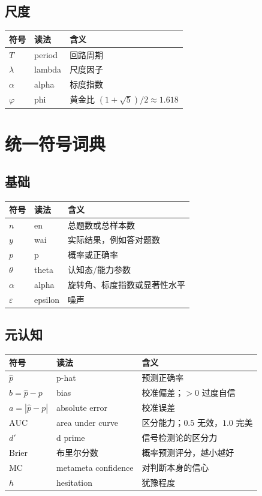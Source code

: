 \documentclass[UTF8,a4paper,11pt]{ctexart}
\begin{document}
\subsection{尺度}

\begin{longtable}{@{}p{3.0cm}p{4.8cm}p{6.4cm}@{}}
\toprule
\textbf{符号} & \textbf{读法} & \textbf{含义} \\
\midrule
$T$ & period & 回路周期 \\
$\lambda$ & lambda & 尺度因子 \\
$\alpha$ & alpha & 标度指数 \\
$\varphi$ & phi & 黄金比 $(1+\sqrt5)/2\approx1.618$ \\
\bottomrule
\end{longtable}

\newpage
\endgroup


\section{统一符号词典}

\subsection{基础}

\begin{longtable}{@{}p{2.8cm}p{4.4cm}p{7.0cm}@{}}
\toprule
\textbf{符号} & \textbf{读法} & \textbf{含义} \\
\midrule
$n$ & en & 总题数或总样本数 \\
$y$ & wai & 实际结果，例如答对题数 \\
$p$ & p & 概率或正确率 \\
$\theta$ & theta & 认知态/能力参数 \\
$\alpha$ & alpha & 旋转角、标度指数或显著性水平 \\
$\varepsilon$ & epsilon & 噪声 \\
\bottomrule
\end{longtable}

\subsection{元认知}

\begin{longtable}{@{}p{2.8cm}p{4.4cm}p{7.0cm}@{}}
\toprule
\textbf{符号} & \textbf{读法} & \textbf{含义} \\
\midrule
$\hat p$ & p-hat & 预测正确率 \\
$b=\hat p-p$ & bias & 校准偏差；$>0$ 过度自信 \\
$a=|\hat p-p|$ & absolute error & 校准误差 \\
$\mathrm{AUC}$ & area under curve & 区分能力；$0.5$ 无效，$1.0$ 完美 \\
$d'$ & d prime & 信号检测论的区分力 \\
$\mathrm{Brier}$ & 布里尔分数 & 概率预测评分，越小越好 \\
$\mathrm{MC}$ & metameta confidence & 对判断本身的信心 \\
$h$ & hesitation & 犹豫程度 \\
\bottomrule
\end{longtable}
\end{document}
